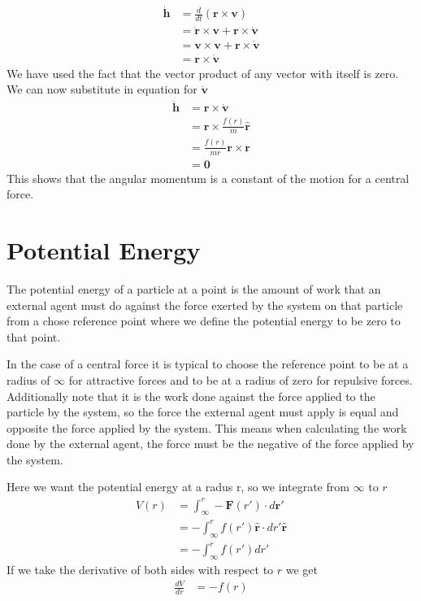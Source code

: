 \begin{align}
\dot{\mathbf{h}}&= \frac{d}{dt}(\mathbf{r}\times\mathbf{v}) \nonumber \\
&= \dot{\mathbf{r}}\times\mathbf{v}+\mathbf{r}\times\dot{\mathbf{v}} \nonumber \\
&= \mathbf{v}\times\mathbf{v}+\mathbf{r}\times\dot{\mathbf{v}}\nonumber \\
&= \mathbf{r}\times\dot{\mathbf{v}}
\end{align}
We have used the fact that the vector product of any vector with itself is zero. We can now substitute in equation  for $\dot{\mathbf{v}}$
\begin{align}
\dot{\mathbf{h}}&= \mathbf{r}\times\dot{\mathbf{v}}\nonumber \\
&= \mathbf{r} \times  \frac{f(r)}{m} \hat{\mathbf{r}}\nonumber \\
&= \frac{f(r)}{mr} \mathbf{r} \times \mathbf{r}\nonumber \\
&= \mathbf{0} \label{eq:central6}
\end{align}
This shows that the angular momentum is a constant of the motion for a central force.

\section{Potential Energy}

The potential energy of a particle at a point is the amount of work that an external agent must do against the force exerted by the system on that particle from a chose reference point where we define the potential energy to be zero to that point.

In the case of a central force it is typical to choose the reference point to be at a radius of $\infty$ for attractive forces and to be at a radius of zero for repulsive forces. Additionally note that it is the work done against the force applied to the particle by the system, so the force the external agent must apply is equal and opposite the force applied by the system. This means when calculating the work done by the external agent, the force must be the negative of the force applied by the system. 

Here we want the potential energy at a radus r, so we integrate from $\infty$ to $r$
\begin{align}
V(r)&=\int_{\infty}^{r} -\mathbf{F}(r') \cdot d\mathbf{r}'  \nonumber \\
&=-\int_{\infty}^{r} f(r') \hat{\mathbf{r}} \cdot dr' \hat{\mathbf{r}} \nonumber \\
&=-\int_{\infty}^{r} f(r') dr'\label{eq:central-potentialEnergy}
\end{align}
If we take the derivative of both sides with respect to $r$ we get
\begin{align}
\frac{d V}{dr}&=-f(r)\label{eq:central3}
\end{align}

